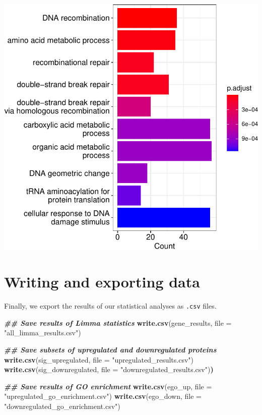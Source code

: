 \documentclass[9pt,a4paper,]{extarticle}
\newenvironment{Shaded}{\begin{snugshade}}{\end{snugshade}}
\newcommand{\AttributeTok}[1]{\textcolor[rgb]{0.13,0.29,0.53}{#1}}
\newcommand{\DocumentationTok}[1]{\textcolor[rgb]{0.56,0.35,0.01}{\textbf{\textit{#1}}}}
\newcommand{\ErrorTok}[1]{\textcolor[rgb]{0.64,0.00,0.00}{\textbf{#1}}}
\newcommand{\FunctionTok}[1]{\textcolor[rgb]{0.13,0.29,0.53}{\textbf{#1}}}
\newcommand{\NormalTok}[1]{#1}
\newcommand{\StringTok}[1]{\textcolor[rgb]{0.31,0.60,0.02}{#1}}
\begin{document}
\begin{center}\includegraphics[height=0.4\textheight]{workflow_expressions_files/figure-latex/GO_enrichment_plot-1} \end{center}

\hypertarget{writing-and-exporting-data}{%
\section{Writing and exporting data}\label{writing-and-exporting-data}}

Finally, we export the results of our statistical analyses as \texttt{.csv} files.

\begin{Shaded}
\begin{Highlighting}[]
\DocumentationTok{\#\# Save results of Limma statistics}
\FunctionTok{write.csv}\NormalTok{(gene\_results, }\AttributeTok{file =} \StringTok{"all\_limma\_results.csv"}\NormalTok{)}

\DocumentationTok{\#\# Save subsets of upregulated and downregulated proteins}
\FunctionTok{write.csv}\NormalTok{(sig\_upregulated, }\AttributeTok{file =} \StringTok{"upregulated\_results.csv"}\NormalTok{)}
\FunctionTok{write.csv}\NormalTok{(sig\_downregulated, }\AttributeTok{file =} \StringTok{"downregulated\_results.csv"}\NormalTok{)}\ErrorTok{)}

\DocumentationTok{\#\# Save results of GO enrichment}
\FunctionTok{write.csv}\NormalTok{(ego\_up, }\AttributeTok{file =} \StringTok{"upregulated\_go\_enrichment.csv"}\NormalTok{)}
\FunctionTok{write.csv}\NormalTok{(ego\_down, }\AttributeTok{file =} \StringTok{"downregulated\_go\_enrichment.csv"}\NormalTok{)}
\end{Highlighting}
\end{Shaded}
\end{document}
